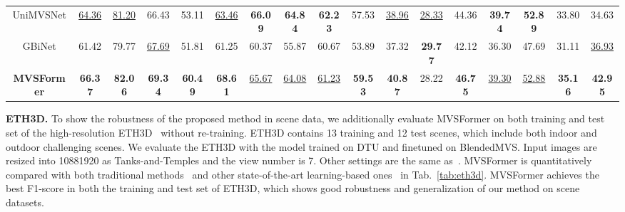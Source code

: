 \documentclass[10pt]{article} \usepackage[preprint]{tmlr}
\begin{document}
\begin{table}
{\begin{tabular}{c|ccccccccc|ccccccc}
{\scriptsize{}UniMVSNet} & {\scriptsize{}\underline{64.36}} & {\scriptsize{}\underline{81.20}} & {\scriptsize{}66.43} & {\scriptsize{}53.11} & {\scriptsize{}\underline{63.46}} & \textbf{\scriptsize{}66.09} & \textbf{\scriptsize{}64.84} & \textbf{\scriptsize{}62.23} & {\scriptsize{}57.53} & {\scriptsize{}\underline{38.96}} & {\scriptsize{}\underline{28.33}} & {\scriptsize{}44.36} & \textbf{\scriptsize{}39.74} & \textbf{\scriptsize{}52.89} & {\scriptsize{}33.80} & {\scriptsize{}34.63}\tabularnewline
{\scriptsize{}GBiNet} & {\scriptsize{}61.42} & {\scriptsize{}79.77 } & {\scriptsize{}\underline{67.69}} & {\scriptsize{}51.81} & {\scriptsize{}61.25} & {\scriptsize{}60.37} & {\scriptsize{}55.87} & {\scriptsize{}60.67} & {\scriptsize{}53.89} & {\scriptsize{}37.32} & \textbf{\scriptsize{}29.77} & {\scriptsize{}42.12} & {\scriptsize{}36.30} & {\scriptsize{}47.69} & {\scriptsize{}31.11} & {\scriptsize{}\underline{36.93}}\tabularnewline
{\textbf{\scriptsize{}MVSFormer}} & \textbf{\scriptsize{}66.37} & \textbf{\scriptsize{}82.06} & \textbf{\scriptsize{}69.34} & \textbf{\scriptsize{}60.49} & \textbf{\scriptsize{}68.61} & {\scriptsize{}\underline{65.67}} & {\scriptsize{}\underline{64.08}} & {\scriptsize{}\underline{61.23}} & \textbf{\scriptsize{}59.53} & \textbf{\scriptsize{}40.87} & {\scriptsize{}28.22} & \textbf{\scriptsize{}46.75} & {\scriptsize{}\underline{39.30}} & {\scriptsize{}\underline{52.88}} & \textbf{\scriptsize{}35.16} & \textbf{\scriptsize{}42.95}\tabularnewline
\hline 
\end{tabular}{\scriptsize\par}}
\end{table}

\noindent\textbf{ETH3D.}
To show the robustness of the proposed method in scene data, we additionally evaluate MVSFormer on both training and test set of the high-resolution ETH3D~\citep{schops2017multi} without re-training. 
ETH3D contains 13 training and 12 test scenes, which include both indoor and outdoor challenging scenes. We evaluate the ETH3D with the model trained on DTU and finetuned on BlendedMVS. Input images are resized into 10881920 as Tanks-and-Temples and the view number is 7. Other settings are the same as~\citet{wang2022itermvs}. MVSFormer is quantitatively compared with both traditional methods~\citep{Galliani_2015_ICCV,schonberger2016pixelwise} and other state-of-the-art learning-based ones~\citep{wang2021patchmatchnet,wang2022itermvs,wang2022mvster} in Tab.~\ref{tab:eth3d}. MVSFormer achieves the best F1-score in both the training and test set of ETH3D, which shows good robustness and generalization of our method on scene datasets. 
\end{document}
